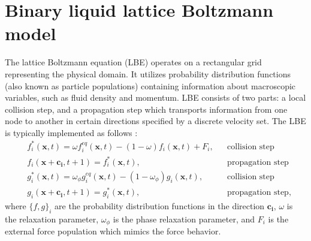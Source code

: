 \documentclass{article}
\begin{document}
\section{Binary liquid lattice Boltzmann model}
The lattice Boltzmann equation (LBE) operates on a rectangular grid representing the
physical domain. It utilizes
probability distribution functions (also known as particle populations)
containing information about
macroscopic variables, such as fluid density and momentum. LBE consists of
two parts: a local collision step, and a propagation step which transports
information from one node to another in certain
directions specified by a discrete velocity set.
The LBE is typically implemented as follows \cite{ginzburg-boundary-main}:
\begin{equation}
\label{standard:implementation}
\begin{aligned}
&f_i^{*}(\bm{x},t)=\omega f_i^{eq}(\bm{x},t)-(1-\omega) f_i(\bm{x},t) +
F_i,&&\text{collision step}\\
&f_i(\bm{x}+\bm{c_i},t+1)=f_i^{*}(\bm{x},t),&&\text{propagation step}\\
&g_i^{*}(\bm{x},t)=\omega_{\phi} g_i^{eq}(\bm{x},t)-(1-\omega_{\phi})
g_i(\bm{x},t),&&\text{collision step}\\
&g_i(\bm{x}+\bm{c_i},t+1)=g_i^{*}(\bm{x},t),&&\text{propagation step},
\end{aligned}
\end{equation}
where $\{f,g\}_i$ are the probability distribution functions in the direction $\bm{c_i}$, $\omega$
is the
relaxation parameter, $\omega_{\phi}$ is the phase relaxation parameter, and $F_i$ is the external
force population which
mimics the force behavior.
\end{document}
